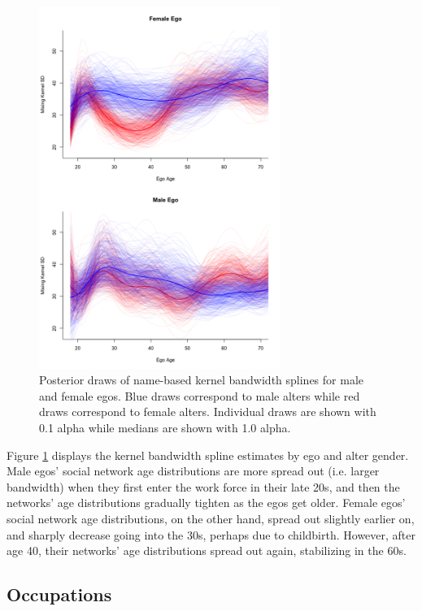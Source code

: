 \begin{figure}
\centering
	\includegraphics[width=0.7\textwidth]{figures/kernel/names/kern_spline_overlay.png}
\caption{Posterior draws of name-based kernel bandwidth splines for male and female egos. Blue draws correspond to male alters while red draws correspond to female alters. Individual draws are shown with 0.1 alpha while medians are shown with 1.0 alpha.}
\label{fig:names_kernel_spline}
\end{figure}

Figure \ref{fig:names_kernel_spline} displays the kernel bandwidth spline estimates by ego and alter gender. Male egos' social network age distributions are more spread out (i.e. larger bandwidth) when they first enter the work force in their late 20s, and then the networks' age distributions gradually tighten as the egos get older. Female egos' social network age distributions, on the other hand, spread out slightly earlier on, and sharply decrease going into the 30s, perhaps due to childbirth. However, after age 40, their networks' age distributions spread out again, stabilizing in the 60s.

\subsection{Occupations}
\label{sec:kernel_results_occs}

